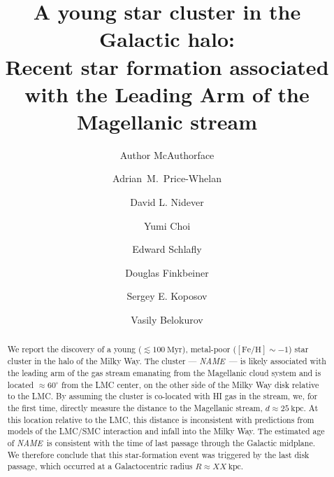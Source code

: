 \documentclass[modern]{aastex62}
\newcommand{\kpc}{\textrm{kpc}}
\newcommand{\clustername}{\textsl{NAME}}
\begin{document}
\title{A young star cluster in the Galactic halo: \\
Recent star formation associated with the Leading Arm of the Magellanic stream}

\author{Author McAuthorface}

\author[0000-0003-0872-7098]{Adrian~M.~Price-Whelan}

\author[0000-0002-1793-3689]{David L. Nidever}

\author[0000-0003-1680-1884]{Yumi Choi}

\author{Edward Schlafly}

\author{Douglas Finkbeiner}

\author{Sergey E. Koposov}

\author{Vasily Belokurov}


\begin{abstract}

We report the discovery of a young ($\lesssim 100~\textrm{Myr}$), metal-poor ($[\textrm{Fe}/\textrm{H}] \sim -1$) star cluster in the halo of the Milky Way.
The cluster --- \clustername\ --- is likely associated with the leading arm of the gas stream emanating from the Magellanic cloud system and is located $\approx 60^\circ$ from the LMC center, on the other side of the Milky Way disk relative to the LMC.
By assuming the cluster is co-located with HI gas in the stream, we, for the first time, directly measure the distance to the Magellanic stream, $d \approx 25~\textrm{kpc}$.
At this location relative to the LMC, this distance is inconsistent with predictions from models of the LMC/SMC interaction and infall into the Milky Way.
The estimated age of \clustername\ is consistent with the time of last passage through the Galactic midplane.
We therefore conclude that this star-formation event was triggered by the last disk passage, which occurred at a Galactocentric radius $R \approx XX~\kpc$.

\end{abstract}
\end{document}

